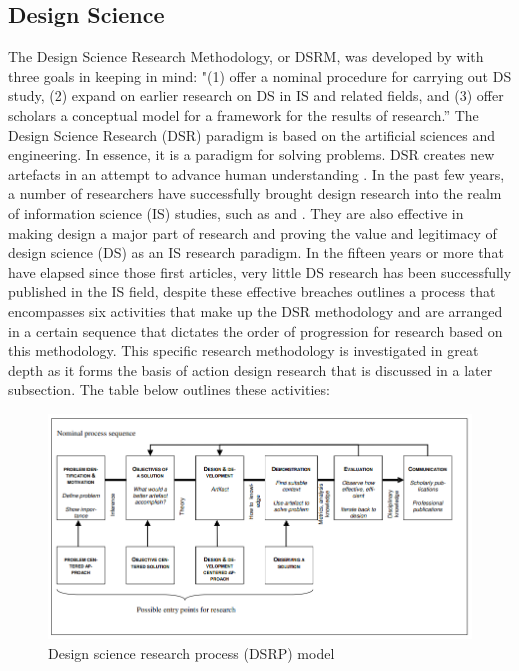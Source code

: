 \subsection{Design Science}
\par{The Design Science Research Methodology, or DSRM, was developed by \cite{peffers2007design} with three goals in keeping in mind: "(1) offer a nominal procedure for carrying out DS study, (2) expand on earlier research on DS in IS and related fields, and (3) offer scholars a conceptual model for a framework for the results of research.” The Design Science Research (DSR) paradigm is based on the artificial sciences and engineering. In essence, it is a paradigm for solving problems. DSR creates new artefacts in an attempt to advance human understanding \citep{hevner2010design}. In the past few years, a number of researchers have successfully brought design research into the realm of information science (IS) studies, such as \cite{hevner2004design} and \cite{walls1992building}. They are also effective in making design a major part of research and proving the value and legitimacy of design science (DS) as an IS research paradigm. In the fifteen years or more that have elapsed since those first articles, very little DS research has been successfully published in the IS field, despite these effective breaches \citep{peffers2007design} outlines a process that encompasses six activities that make up the DSR methodology and are arranged in a certain sequence that dictates the order of progression for research based on this methodology. This specific research methodology is investigated in great depth as it forms the basis of action design research that is discussed in a later subsection. The table below outlines these activities:}
\clearpage
\begin{figure}[h!]
    \centering
    \includegraphics[width=1\linewidth]{img/Design science research process (DSRP) model.png}
    \caption{Design science research process (DSRP) model}
    \label{fig:enter-label}
\end{figure}
